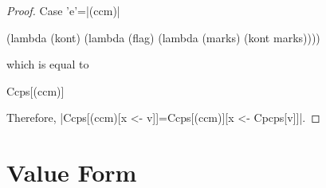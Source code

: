 \begin{proof}{Case \scheme'e'=\scheme|(ccm)|}
\begin{schemeblock}
\begin{schemedisplay}
(lambda (kont)
  (lambda (flag)
    (lambda (marks)
      (kont marks))))
\end{schemedisplay}
\end{schemeblock}
which is equal to
\begin{schemeblock}
\begin{schemedisplay}
Ccps[(ccm)]
\end{schemedisplay}
\end{schemeblock}

Therefore, \scheme|Ccps[(ccm)[x <- v]]=Ccps[(ccm)][x <- Cpcps[v]]|.
\end{proof}

\section{Value Form}
